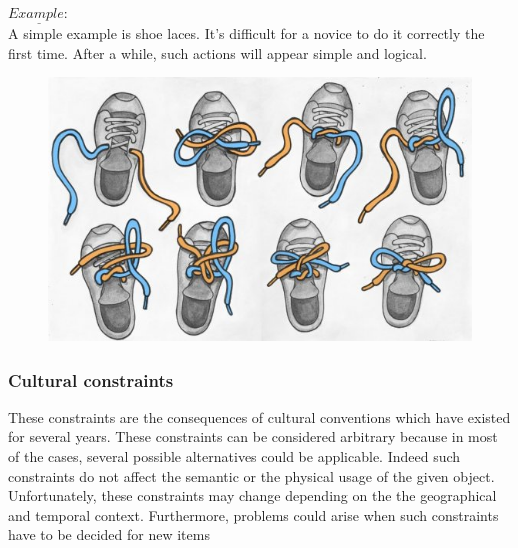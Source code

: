 \documentclass[a4paper,11pt] {article}
\theoremstyle{definition}
\begin{document}
        $\underline{Example:}$\\
        A simple example is shoe laces. It's difficult for a novice to do it correctly the first time. After a while, such actions will appear simple and logical.
        \begin{figure}[h]
        \centering
        \includegraphics[scale=0.3]{fig-report/tie_your_shoes.jpg}
        \end{figure}
        \subsubsection{Cultural constraints}
        These constraints are the consequences of cultural conventions which have existed for several years. These constraints can be considered arbitrary because in most of the cases, several possible alternatives could be applicable. Indeed such constraints do not affect the semantic or the physical usage of the given object. Unfortunately, these constraints may change depending on the the geographical and temporal context. Furthermore, problems could arise when such constraints have to be decided for new items\\
\end{document}
